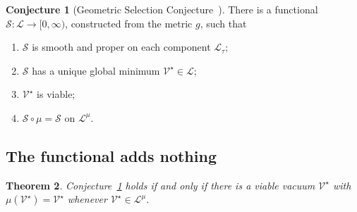 \documentclass[11pt]{amsart}
\newtheorem{theorem}{Theorem}
\theoremstyle{definition}
\newtheorem{conjecture}[theorem]{Conjecture}
\theoremstyle{remark}
\newcommand{\cL}{\mathcal{L}}
\newcommand{\cS}{\mathcal{S}}
\newcommand{\cV}{\mathcal{V}}
\begin{document}
\begin{conjecture}[Geometric Selection Conjecture~\cite{Bha26a}]
\label{conj:gsc}
There is a functional $\cS:\cL\to[0,\infty)$, constructed from the metric
$g$, such that
\begin{enumerate}[label=\textup{(G\arabic*)},leftmargin=*,itemsep=1pt]
\item $\cS$ is smooth and proper on each component $\cL_\tau$;
\item $\cS$ has a unique global minimum $\cV^\star\in\cL$;
\item $\cV^\star$ is viable;
\item $\cS\circ\mu=\cS$ on $\cL^\mu$.
\end{enumerate}
\end{conjecture}

\subsection{The functional adds nothing}

\begin{theorem}\label{thm:gscequiv}
Conjecture~\ref{conj:gsc} holds if and only if there is a viable vacuum
$\cV^\star$ with $\mu(\cV^\star)=\cV^\star$ whenever $\cV^\star\in\cL^\mu$.
\end{theorem}
\end{document}
